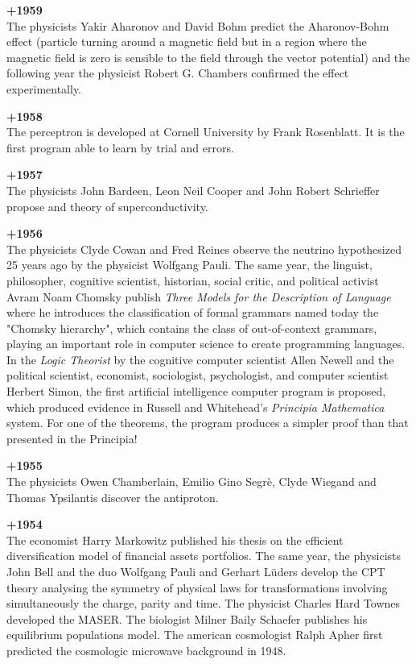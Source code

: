 \textbf{+1959}\\
The physicists Yakir Aharonov and David Bohm predict the Aharonov-Bohm effect (particle turning around a magnetic field but in a region where the magnetic field is zero is sensible to the field through the vector potential) and the following year the physicist Robert G. Chambers confirmed the effect experimentally. 

\textbf{+1958}\\
The perceptron is developed at Cornell University by Frank Rosenblatt. It is the first program able to learn by trial and errors.

\textbf{+1957}\\
The physicists John Bardeen, Leon Neil Cooper and John Robert Schrieffer propose and theory of superconductivity.

\textbf{+1956}\\
The physicists Clyde Cowan and Fred Reines observe the neutrino hypothesized 25 years ago by the physicist Wolfgang Pauli. The same year, the  linguist, philosopher, cognitive scientist, historian, social critic, and political activist Avram Noam Chomsky publish \textit{Three Models for the Description of Language} where he introduces the classification of formal grammars named today the "Chomsky hierarchy", which contains the class of out-of-context grammars, playing an important role in computer science to create programming languages. In the \textit{Logic Theorist} by the cognitive computer scientist Allen Newell and the political scientist, economist, sociologist, psychologist, and computer scientist Herbert Simon, the first artificial intelligence computer program is proposed, which produced evidence in Russell and Whitehead's \textit{Principia Mathematica} system. For one of the theorems, the program produces a simpler proof than that presented in the Principia!

\textbf{+1955}\\
The physicists Owen Chamberlain, Emilio Gino Segrè, Clyde Wiegand and Thomas Ypsilantis discover the antiproton.

\textbf{+1954}\\
The economist Harry Markowitz published his thesis on the efficient diversification model of financial assets portfolios. The same year, the physicists John Bell and the duo Wolfgang Pauli and Gerhart Lüders develop the CPT theory analysing the symmetry of physical laws for transformations involving simultaneously the charge, parity and time. The physicist Charles Hard Townes developed the MASER. The biologist Milner Baily Schaefer publishes his equilibrium populations model. The american cosmologist Ralph Apher first predicted the cosmologic microwave background in 1948.


